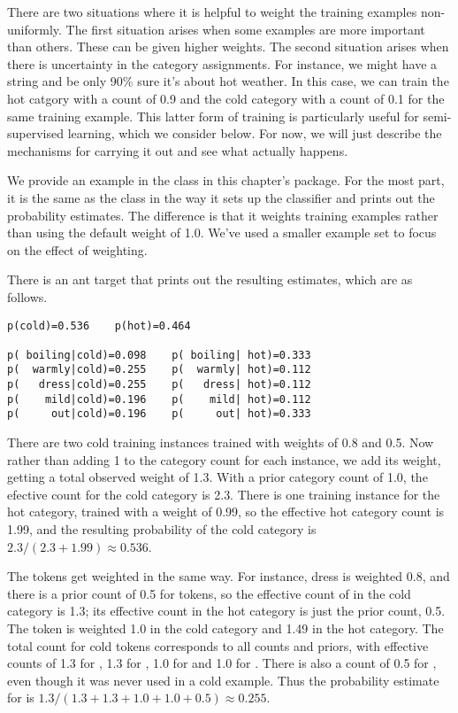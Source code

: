 There are two situations where it is helpful to weight the training
examples non-uniformly.  The first situation arises when some examples
are more important than others.  These can be given higher weights.
The second situation arises when there is uncertainty in the category
assignments.  For instance, we might have a string and be only 90\%
sure it's about hot weather.  In this case, we can train the hot
catgory with a count of 0.9 and the cold category with a count of 0.1
for the same training example.  This latter form of training is
particularly useful for semi-supervised learning, which we consider
below.  For now, we will just describe the mechanisms for carrying it
out and see what actually happens.

We provide an example in the class  in this
chapter's package.  For the most part, it is the same as the
 class in the way it sets up the classifier and
prints out the probability estimates.  The difference is that it weights
training examples rather than using the default weight of 1.0.
%
%
We've used a smaller example set to focus on the effect of weighting.

There is an ant target  that prints out the
resulting estimates, which are as follows.

\begin{verbatim}
p(cold)=0.536    p(hot)=0.464

p( boiling|cold)=0.098    p( boiling| hot)=0.333
p(  warmly|cold)=0.255    p(  warmly| hot)=0.112
p(   dress|cold)=0.255    p(   dress| hot)=0.112
p(    mild|cold)=0.196    p(    mild| hot)=0.112
p(     out|cold)=0.196    p(     out| hot)=0.333
\end{verbatim}
%
There are two cold training instances trained with weights of 0.8 and
0.5.  Now rather than adding 1 to the category count for each
instance, we add its weight, getting a total observed weight of 1.3.
With a prior category count of 1.0, the efective count for the cold
category is 2.3.  There is one training instance for the hot category,
trained with a weight of 0.99, so the effective hot category count is
1.99, and the resulting probability of the cold category is
$2.3/(2.3+1.99) \approx 0.536$.

The tokens get weighted in the same way.  For instance, dress is
weighted 0.8, and there is a prior count of 0.5 for tokens, so the
effective count of  in the cold category is 1.3;
its effective count in the hot category is just the prior count, 0.5.
The token  is weighted 1.0 in the cold category and
1.49 in the hot category.  The total count for cold tokens corresponds
to all counts and priors, with effective counts of 1.3 for
, 1.3 for , 1.0 for
 and 1.0 for .  There is also
a count of 0.5 for , even though it was never
used in a cold example.  Thus the probability estimate for
 is $1.3/(1.3 + 1.3 + 1.0 + 1.0 + 0.5) \approx
0.255$.

